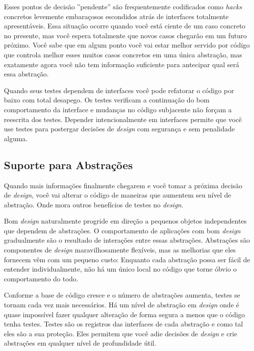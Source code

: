 Esses pontos de decisão ''pendente'' são frequentemente codificados como \textit{hacks} concretos levemente embaraçosos escondidos atrás de interfaces totalmente apresentáveis. Essa situação ocorre quando você está ciente de um caso concreto no presente, mas você espera totalmente que novos casos chegarão em um futuro próximo. Você sabe que em algum ponto você vai estar melhor servido por código que controla melhor esses muitos casos concretos em uma única abstração, mas exatamente agora você não tem informação suficiente para antecipar qual será essa abstração.

Quando seus testes dependem de interfaces você pode refatorar o código por baixo com total desapego. Os testes verificam a continuação do bom comportamento da interface e mudanças no código subjacente não forçam a reescrita dos testes. Depender intencionalmente em interfaces permite que você use testes para postergar decisões de \textit{design} com segurança e sem penalidade alguma.

\subsection{Suporte para Abstrações}

Quando mais informações finalmente chegarem e você tomar a próxima decisão de \textit{design}, você vai alterar o código de maneiras que aumentem seu nível de abstração. Onde mora outros benefícios de testes no \textit{design}.

Bom \textit{design} naturalmente progride em direção a pequenos objetos independentes que dependem de abstrações. O comportamento de aplicações com bom \textit{design} gradualmente são o resultado de interações entre essas abstrações. Abstrações são componentes de \textit{design} maravilhosamente flexíveis, mas as melhorias que eles fornecem vêm com um pequeno custo: Enquanto cada abstração possa ser fácil de entender individualmente, não há um único local no código que torne óbvio o comportamento do todo.

Conforme a base de código cresce e o número de abstrações aumenta, testes se tornam cada vez mais necessários. Há um nível de abstração em \textit{design} onde é quase impossível fazer qualquer alteração de forma segura a menos que o código tenha testes. Testes são os registros das interfaces de cada abstração e como tal eles são a sua proteção. Eles permitem que você adie decisões de \textit{design} e crie abstrações em qualquer nível de profundidade útil.

